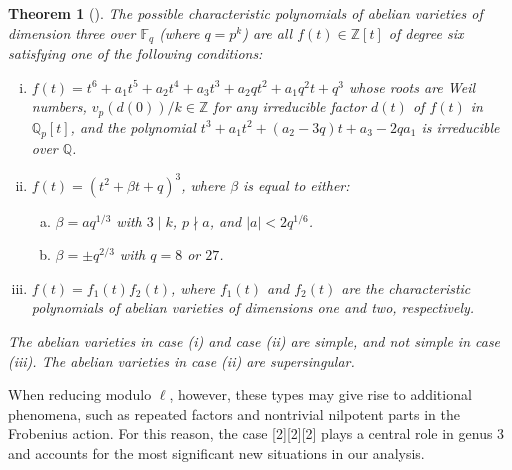 \documentclass[11pt,a4paper]{article}
\theoremstyle{plain}
\newtheorem{theorem}{Theorem}[section]
\theoremstyle{definition}
\theoremstyle{remark}
\begin{document}
\begin{theorem}[{\cite[Theorem 1]{Xing}}]
The possible characteristic polynomials of abelian varieties of dimension three over $\mathbb{F}_{q}$ (where $q=p^k$) are all $f(t) \in \mathbb{Z}[t]$ of degree six satisfying one of the following conditions:
\begin{enumerate}[(i)]
    \item $f(t)=t^{6}+a_{1}t^{5}+a_{2}t^{4}+a_{3}t^{3}+a_{2}qt^{2}+a_{1}q^{2}t+q^{3}$ whose roots are Weil numbers, $v_p(d(0))/k \in \mathbb{Z}$ for any irreducible factor $d(t)$ of $f(t)$ in $\mathbb{Q}_{p}[t]$, and the polynomial $t^{3}+a_{1}t^{2}+(a_{2}-3q)t+a_{3}-2qa_{1}$ is irreducible over $\mathbb{Q}$.
    
    \item $f(t)=(t^{2}+\beta t+q)^{3}$, where $\beta$ is equal to either:
    \begin{enumerate}[(a)]
        \item $\beta=aq^{1/3}$ with $3 \mid k$, $p \nmid a$, and $|a| < 2q^{1/6}$.
        \item $\beta=\pm q^{2/3}$ with $q=8$ or $27$.
    \end{enumerate}
    
    \item $f(t)=f_{1}(t)f_{2}(t)$, where $f_{1}(t)$ and $f_{2}(t)$ are the characteristic polynomials of abelian varieties of dimensions one and two, respectively.
\end{enumerate}
The abelian varieties in case (i) and case (ii) are simple, and not simple in case (iii). The abelian varieties in case (ii) are supersingular.
\end{theorem}








 When reducing modulo $\ell$, however, these types may give rise to additional phenomena, such as repeated factors and nontrivial nilpotent parts in the Frobenius action. For this reason, the case 
[2][2][2] plays a central role in genus 3 and accounts for the most significant new situations in our analysis.
\end{document}
